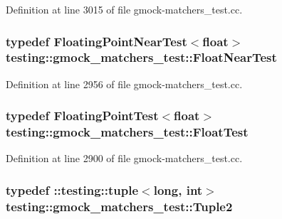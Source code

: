 Definition at line 3015 of file gmock-\/matchers\+\_\+test.\+cc.

\subsubsection[{\texorpdfstring{Float\+Near\+Test}{FloatNearTest}}]{\setlength{\rightskip}{0pt plus 5cm}typedef {\bf Floating\+Point\+Near\+Test}$<$float$>$ {\bf testing\+::gmock\+\_\+matchers\+\_\+test\+::\+Float\+Near\+Test}}\hypertarget{namespacetesting_1_1gmock__matchers__test_a426b51f464dcb48033946e1bf3cc8795}{}\label{namespacetesting_1_1gmock__matchers__test_a426b51f464dcb48033946e1bf3cc8795}


Definition at line 2956 of file gmock-\/matchers\+\_\+test.\+cc.

\subsubsection[{\texorpdfstring{Float\+Test}{FloatTest}}]{\setlength{\rightskip}{0pt plus 5cm}typedef {\bf Floating\+Point\+Test}$<$float$>$ {\bf testing\+::gmock\+\_\+matchers\+\_\+test\+::\+Float\+Test}}\hypertarget{namespacetesting_1_1gmock__matchers__test_a145329e433869625f9f0e98a0cdfd7b4}{}\label{namespacetesting_1_1gmock__matchers__test_a145329e433869625f9f0e98a0cdfd7b4}


Definition at line 2900 of file gmock-\/matchers\+\_\+test.\+cc.

\subsubsection[{\texorpdfstring{Tuple2}{Tuple2}}]{\setlength{\rightskip}{0pt plus 5cm}typedef \+::testing\+::tuple$<$long, int$>$ {\bf testing\+::gmock\+\_\+matchers\+\_\+test\+::\+Tuple2}}\hypertarget{namespacetesting_1_1gmock__matchers__test_a8b82c859cd28da9e7f7d4c6091a3165c}{}\label{namespacetesting_1_1gmock__matchers__test_a8b82c859cd28da9e7f7d4c6091a3165c}


